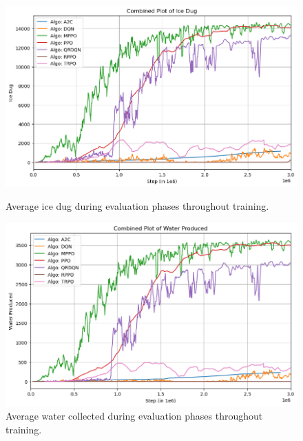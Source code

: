 
\begin{figure}[htbp]
    \centering
    \begin{minipage}{0.5\textwidth}
        \centering
        \includegraphics[width=\linewidth]{images/results_singleunit/mean_ice_total.png}
        \captionsetup{justification=justified, singlelinecheck=false, width=0.8\linewidth, labelfont=bf} 
        \caption{Average ice dug during evaluation phases throughout training.}
        \label{fig:mean-ice-total}
    \end{minipage}\hfill
    \begin{minipage}{0.5\textwidth}
        \centering
        \includegraphics[width=\linewidth]{images/results_singleunit/mean_water_total.png}
        \captionsetup{justification=justified, singlelinecheck=false, width=0.9\linewidth, labelfont=bf} 
        \caption{Average water collected during evaluation phases throughout training.}
        \label{fig:mean-water-total}
    \end{minipage}
\end{figure}

